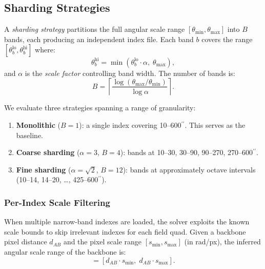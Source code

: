\documentclass[twocolumn, 10pt]{article}
\newcommand{\arcsec}{\ensuremath{^{\prime\prime}}}
\begin{document}
\subsection{Sharding Strategies} \label{sec:sharding}

A \emph{sharding strategy} partitions the full angular scale range
$[\theta_{\min}, \theta_{\max}]$ into $B$ bands, each producing an
independent index file. Each band $b$ covers the range
$[\theta_b^{\text{lo}}, \theta_b^{\text{hi}}]$ where:
\begin{equation}
    \theta_b^{\text{hi}} = \min\left(\theta_b^{\text{lo}} \cdot \alpha,\;
    \theta_{\max}\right),
\end{equation}
and $\alpha$ is the \emph{scale factor} controlling band width. The
number of bands is:
\begin{equation}
    B = \left\lceil \frac{\log(\theta_{\max}/\theta_{\min})}{\log \alpha}
    \right\rceil.
\end{equation}

We evaluate three strategies spanning a range of granularity:

\begin{enumerate}
    \item \textbf{Monolithic} ($B=1$): a single index covering
          10--600\arcsec. This serves as the baseline.
    \item \textbf{Coarse sharding} ($\alpha = 3$, $B=4$): bands at
          10--30, 30--90, 90--270, 270--600\arcsec.
    \item \textbf{Fine sharding} ($\alpha = \sqrt{2}$, $B=12$): bands
          at approximately octave intervals (10--14, 14--20, \ldots,
          425--600\arcsec).
\end{enumerate}

\subsubsection{Per-Index Scale Filtering} \label{sec:filtering}

When multiple narrow-band indexes are loaded, the solver exploits the
known scale bounds to skip irrelevant indexes for each field quad. Given
a backbone pixel distance $d_{AB}$ and the pixel scale range
$[s_{\min}, s_{\max}]$ (in rad/px), the inferred angular scale range
of the backbone is:
\begin{equation}
    [\theta^{\text{lo}}, \theta^{\text{hi}}] =
    [d_{AB} \cdot s_{\min},\; d_{AB} \cdot s_{\max}].
\end{equation}
\end{document}
